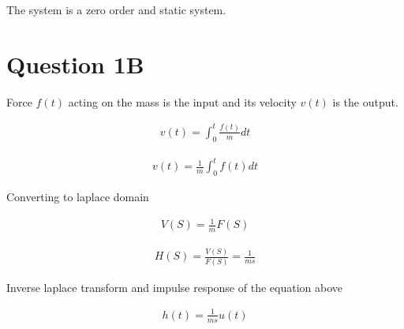 \documentclass{article}
\begin{document}

The system is a zero order and static system.

\section{Question 1B}
Force $f(t)$ acting on the mass is the input and its velocity $ v(t)$ is the output.

\begin{equation*}
    \begin{aligned}
        v(t) = \int_{0}^{t} \frac{f(t)}{m} dt
    \end{aligned}
\end{equation*}

\begin{equation*}
    \begin{aligned}
        v(t) = \frac{1}{m} \int_{0}^{t} f(t) dt
    \end{aligned}
\end{equation*}

Converting to laplace domain


\begin{equation*}
    \begin{aligned}
        V(S) = \frac{1}{m} F(S)
    \end{aligned}
\end{equation*}

\begin{equation*}
    \begin{aligned}
        H(S) = \frac{V(S)}{F(S)} = \frac{1}{ms}
    \end{aligned}
\end{equation*}

Inverse laplace transform and impulse response of the equation above

\begin{equation*}
    \begin{aligned}
        h(t) = \frac{1}{ms} u(t)
    \end{aligned}
\end{equation*}
\end{document}
